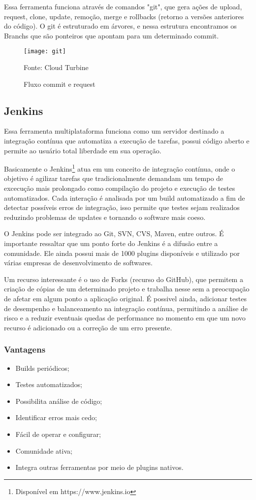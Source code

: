 Essa ferramenta funciona através de comandos "git", que gera ações de upload, request, clone, update, remoção, merge e rollbacks (retorno a versões anteriores do código). O git é estruturado em árvores, e nessa estrutura encontramos os Branchs que são ponteiros que apontam para um determinado commit.

\begin{figure} [htb]
	\centering
	\texttt{[image: git]}
	\caption{Fluxo commit e request}
	Fonte: Cloud Turbine\footnotemark
	\label{fig:git}
\end{figure}

\subsection{Jenkins}

Essa ferramenta multiplataforma funciona como um servidor destinado a integração contínua que automatiza a execução de tarefas, possui código aberto e permite ao usuário total liberdade em sua operação.

Basicamente o Jenkins\footnote{Disponível em https://www.jenkins.io} atua em um conceito de integração contínua, onde o objetivo é agilizar tarefas que tradicionalmente demandam um tempo de excecução mais prolongado como compilação do projeto e execução de testes automatizados. Cada interação é analisada por um build automatizado a fim de detectar possíveis erros de integração, isso permite que testes sejam realizados reduzindo problemas de updates e tornando o software mais coeso.\cite{atalay}

O Jenkins pode ser integrado ao Git, SVN, CVS, Maven, entre outros. É importante ressaltar que um ponto forte do Jenkins é a difusão entre a comunidade. Ele ainda possui mais de 1000 plugins disponíveis e utilizado por várias empresas de desenvolvimento de softwares.

Um recurso interessante é o uso de Forks (recurso do GitHub), que permitem a criação de cópias de um determinado projeto e trabalha nesse sem a preocupação de afetar em algum ponto a aplicação original. É possivel ainda, adicionar testes de desempenho e balanceamento na integração contínua, permitindo a análise de risco e a reduzir eventuais quedas de performance no momento em que um novo recurso é adicionado ou a correção de um erro presente.

\subsubsection{Vantagens}
\begin{itemize}
\item Builds periódicos;
\item Testes automatizados;
\item Possibilita análise de código;
\item Identificar erros mais cedo;
\item Fácil de operar e configurar;
\item Comunidade ativa;
\item Integra outras ferramentas por meio de plugins nativos.
\end{itemize}



